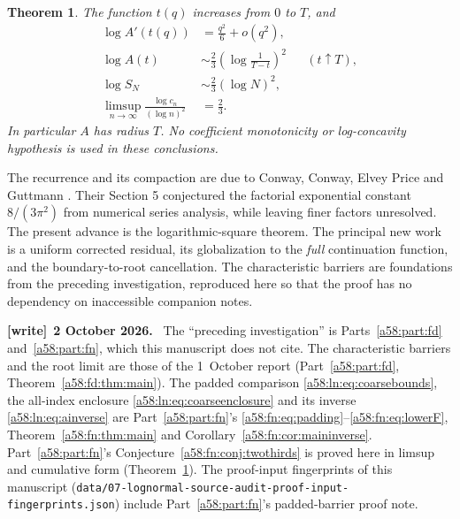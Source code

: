 \documentclass[11pt,letterpaper]{article}
\newcommand{\file}[1]{\nolinkurl{#1}}
\newtheorem{theorem}{Theorem}[section]
\theoremstyle{remark}
\newenvironment{writenote}[1][]{\par\smallskip\begingroup\small
 \noindent\textbf{[write]}\if\relax\detokenize{#1}\relax\else~\textbf{#1.}\fi\ }%
 {\par\endgroup\smallskip}
\begin{document}
\begin{theorem}\label{a58:ln:thm:main}
The function $t(q)$ increases from $0$ to $T$, and
\begin{align}
 \log A'(t(q))&=\frac{q^2}{6}+o(q^2),\label{a58:ln:eq:mainroot}\\
 \log A(t)&\sim\frac23\left(\log\frac1{T-t}\right)^2
       &&(t\uparrow T),\label{a58:ln:eq:mainA}\\
 \log S_N&\sim\frac23(\log N)^2,\label{a58:ln:eq:maincum}\\
 \limsup_{n\to\infty}\frac{\log c_n}{(\log n)^2}&=\frac23.
       \label{a58:ln:eq:mainlimsup}
\end{align}
In particular $A$ has radius $T$. No coefficient monotonicity or
log-concavity hypothesis is used in these conclusions.
\end{theorem}

The recurrence and its compaction are due to Conway, Conway, Elvey Price
and Guttmann \cite[Sections 2.2 and 2.6]{CCEG}. Their Section 5 conjectured
the factorial exponential constant $8/(3\pi^2)$ from numerical series
analysis, while leaving finer factors unresolved. The present advance is
the logarithmic-square theorem. The principal new work is a uniform
corrected residual, its globalization to the \emph{full} continuation
function, and the boundary-to-root cancellation. The characteristic
barriers are foundations from the preceding investigation, reproduced
here so that the proof has no dependency on inaccessible companion notes.
\begin{writenote}[2 October 2026]
The ``preceding investigation'' is Parts~\ref{a58:part:fd} and~\ref{a58:part:fn}, which this manuscript does not cite. The characteristic barriers and the root limit are those of the 1~October report (Part~\ref{a58:part:fd}, Theorem~\ref{a58:fd:thm:main}). The padded comparison \eqref{a58:ln:eq:coarsebounds}, the all-index enclosure \eqref{a58:ln:eq:coarseenclosure} and its inverse \eqref{a58:ln:eq:ainverse} are Part~\ref{a58:part:fn}'s \eqref{a58:fn:eq:padding}--\eqref{a58:fn:eq:lowerF}, Theorem~\ref{a58:fn:thm:main} and Corollary~\ref{a58:fn:cor:maininverse}. Part~\ref{a58:part:fn}'s Conjecture~\ref{a58:fn:conj:twothirds} is proved here in limsup and cumulative form (Theorem~\ref{a58:ln:thm:main}). The proof-input fingerprints of this manuscript (\file{data/07-lognormal-source-audit-proof-input-fingerprints.json}) include Part~\ref{a58:part:fn}'s padded-barrier proof note.
\end{writenote}
\end{document}
